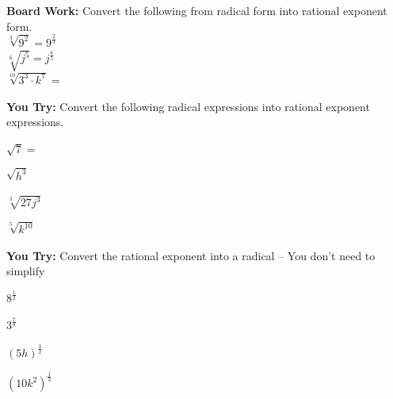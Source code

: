 \documentclass[12pt]{article}
\begin{document}
\pagebreak

\textbf{Board Work:} Convert the following from radical form into rational exponent form.\\

$\sqrt[3]{9^2}=9^{\frac{2}{3}}$\\ 

$\sqrt[6]{j^5}=j^{\frac{6}{5}}$\\

$\sqrt[10]{3^3 \cdot k^7}=$\underline{\hspace{2in}}\\


\hrulefill

\textbf{You Try:} Convert the following radical expressions into rational exponent expressions.\\

\begin{enumerate}
\begin{multicols}{2}

\item $\sqrt{7}=$\\

\item $\sqrt{h^3}$\\

\item $\sqrt[3]{27j^3}$\\

\item $\sqrt[5]{k^{10}}$\\


\end{multicols}
\end{enumerate}

\hrulefill

\textbf{You Try:} Convert the rational exponent into a radical -- You don't need to simplify

\begin{enumerate}[resume]
\begin{multicols}{2}

\item $8^{\frac{1}{2}}$\\

\item $3^{\frac{7}{8}}$\\

\item $(5h)^{\frac{3}{2}}$\\

\item $(10k^2)^{\frac{1}{3}}$\\

\end{multicols}
\end{enumerate}
\end{document}
